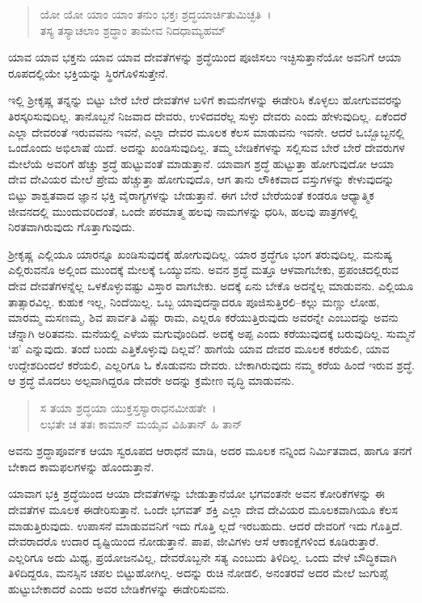 \begin{verse}
ಯೋ ಯೋ ಯಾಂ ಯಾಂ ತನುಂ ಭಕ್ತಃ ಶ್ರದ್ಧಯಾರ್ಚಿತುಮಿಚ್ಛತಿ~।\\ತಸ್ಯ ತಸ್ಯಾಚಲಾಂ ಶ್ರದ್ಧಾಂ ತಾಮೇವ ನಿದಧಾಮ್ಯಹಮ್ 
\end{verse}

{\small ಯಾವ ಯಾವ ಭಕ್ತನು ಯಾವ ಯಾವ ದೇವತೆಗಳನ್ನು ಶ್ರದ್ಧೆಯಿಂದ ಪೂಜಿಸಲು ಇಚ್ಛಿಸುತ್ತಾನೆಯೋ ಅವನಿಗೆ ಆಯಾ ರೂಪದಲ್ಲಿಯೇ ಭಕ್ತಿಯನ್ನು ಸ್ಥಿರಗೊಳಿಸುತ್ತೇನೆ.}

ಇಲ್ಲಿ ಶ‍್ರೀಕೃಷ್ಣ ತನ್ನನ್ನು ಬಿಟ್ಟು ಬೇರೆ ಬೇರೆ ದೇವತೆಗಳ ಬಳಿಗೆ ಕಾಮನೆಗಳನ್ನು ಈಡೇರಿಸಿ ಕೊಳ್ಳಲು ಹೋಗುವವರನ್ನು ತಿರಸ್ಕರಿಸುವುದಿಲ್ಲ. ತಾನೊಬ್ಬನೆ ನಿಜವಾದ ದೇವರು, ಉಳಿದವರೆಲ್ಲ ಸುಳ್ಳು ದೇವರು ಎಂದು ಹೇಳುವುದಿಲ್ಲ. ಏಕೆಂದರೆ ಎಲ್ಲಾ ದೇವರಂತೆ ಇರುವವನು ಇವನೆ, ಎಲ್ಲಾ ದೇವರ ಮೂಲಕ ಕೆಲಸ ಮಾಡುವನು ಇವನೇ. ಆದರೆ ಒಬ್ಬೊಬ್ಬನಲ್ಲಿ ಒಂದೊಂದು ಅಭಿಲಾಷೆ ಯಿದೆ. ಅದನ್ನು ಖಂಡಿಸುವುದಿಲ್ಲ. ತಮ್ಮ ಬೇಡಿಕೆಗಳನ್ನು ಸಲ್ಲಿಸುವ ಬೇರೆ ಬೇರೆ ದೇವರುಗಳ ಮೇಲೆಯೆ ಅವರಿಗೆ ಹೆಚ್ಚು ಶ್ರದ್ಧೆ ಹುಟ್ಟುವಂತೆ ಮಾಡುತ್ತಾನೆ. ಯಾವಾಗ ಶ್ರದ್ಧೆ ಹುಟ್ಟುತ್ತಾ ಹೋಗುವುದೋ ಆಯಾ ದೇವ ದೇವಿಯರ ಮೇಲೆ ಪ್ರೇಮ ಹೆಚ್ಚುತ್ತಾ ಹೋಗುವುದೊ, ಆಗ ತಾನು ಲೌಕಿಕವಾದ ವಸ್ತುಗಳನ್ನು ಕೇಳುವುದನ್ನು ಬಿಟ್ಟು ಶಾಶ್ವತವಾದ ಜ್ಞಾನ ಭಕ್ತಿ ವೈರಾಗ್ಯಗಳನ್ನು ಬೇಡುತ್ತಾನೆ. ಈಗ ಬೇರೆ ಬೇರೆಯಂತೆ ಕಂಡರೂ ಆಧ್ಯಾತ್ಮಿಕ ಜೀವನದಲ್ಲಿ ಮುಂದುವರಿದಂತೆ, ಒಂದೇ ಪರಮಾತ್ಮ ಹಲವು ನಾಮಗಳನ್ನು ಧರಿಸಿ, ಹಲವು ಪಾತ್ರಗಳಲ್ಲಿ ನಿರತವಾಗಿರುವುದು ಗೊತ್ತಾಗುವುದು.

ಶ‍್ರೀಕೃಷ್ಣ ಎಲ್ಲಿಯೂ ಯಾರನ್ನೂ ಖಂಡಿಸುವುದಕ್ಕೆ ಹೋಗುವುದಿಲ್ಲ. ಯಾರ ಶ್ರದ್ಧೆಗೂ ಭಂಗ ತರುವುದಿಲ್ಲ. ಮನುಷ್ಯ ಎಲ್ಲಿರುವನೊ ಅಲ್ಲಿಂದ ಮುಂದಕ್ಕೆ ಮೇಲಕ್ಕೆ ಒಯ್ಯುವನು. ಅವನ ಶ್ರದ್ಧೆ ಮತ್ತೂ ಆಳವಾಗಬೇಕು, ಪ್ರಪಂಚದಲ್ಲಿರುವ ದೇವ ದೇವತೆಗಳನ್ನೆಲ್ಲ ಒಳಕೊಳ್ಳುವಷ್ಟು ವಿಸ್ತಾರ ವಾಗಬೇಕು. ಅದಕ್ಕೆ ಏನು ಬೇಕೊ ಅದನ್ನೆಲ್ಲ ಮಾಡುವನು. ಎಲ್ಲಿಯೂ ತಾತ್ಸಾರವಿಲ್ಲ. ಕುಹುಕ ಇಲ್ಲ, ನಿಂದೆಯಿಲ್ಲ. ಒಬ್ಬ ಯಾವುದನ್ನಾದರೂ ಪೂಜಿಸುತ್ತಿರಲಿ–ಕಲ್ಲು ಮಣ್ಣು ಲೋಹ, ಮಾರಮ್ಮ ಮಸಣಮ್ಮ, ಶಿವ ಪಾರ್ವತಿ ವಿಷ್ಣು ರಾಮ, ಎಲ್ಲರೂ ಕರೆಯುತ್ತಿರುವುದು ಅವರನ್ನೇ ಎಂಬುದನ್ನು ಅವನು ಚೆನ್ನಾಗಿ ಅರಿತವನು. ಮನೆಯಲ್ಲಿ ಎಳೆಯ ಮಗುವೊಂದಿದೆ. ಅದಕ್ಕೆ ಅಪ್ಪ ಎಂದು ಕರೆಯುವುದಕ್ಕೆ ಬರುವುದಿಲ್ಲ. ಸುಮ್ಮನೆ ‘ಪ’ ಎನ್ನುವುದು. ತಂದೆ ಬಂದು ಎತ್ತಿಕೊಳ್ಳುವು ದಿಲ್ಲವೆ? ಹಾಗೆಯೆ ಯಾವ ದೇವರ ಮೂಲಕ ಕರೆಯಲಿ, ಯಾವ ಉದ್ದೇಶದಿಂದಲೆ ಕರೆಯಲಿ, ಎಲ್ಲರಿಗೂ ಓ ಕೊಡುವನು ದೇವರು. ಬೇಕಾಗಿರುವುದು ನಮ್ಮ ಕರೆಯ ಹಿಂದೆ ಇರುವ ಶ್ರದ್ಧೆ. ಆ ಶ್ರದ್ಧೆ ಮೊದಲು ಅಲ್ಪವಾಗಿದ್ದರೂ ದೇವರೇ ಅದನ್ನು ಕ್ರಮೇಣ ವೃದ್ಧಿ ಮಾಡುವನು.

\begin{verse}
ಸ ತಯಾ ಶ್ರದ್ಧಯಾ ಯುಕ್ತಸ್ತಸ್ಯಾರಾಧನಮೀಹತೇ~।\\ಲಭತೇ ಚ ತತಃ ಕಾಮಾನ್ ಮಯೈವ ವಿಹಿತಾನ್ ಹಿ ತಾನ್ 
\end{verse}

{\small ಅವನು ಶ್ರದ್ಧಾಪೂರ್ವಕ ಆಯಾ ಸ್ವರೂಪದ ಆರಾಧನೆ ಮಾಡಿ, ಅದರ ಮೂಲಕ ನನ್ನಿಂದ ನಿರ್ಮಿತವಾದ, ಹಾಗೂ ತನಗೆ ಬೇಕಾದ ಕಾಮಫಲಗಳನ್ನು ಹೊಂದುತ್ತಾನೆ.}

ಯಾವಾಗ ಭಕ್ತಿ ಶ್ರದ್ಧೆಯಿಂದ ಆಯಾ ದೇವತೆಗಳನ್ನು ಬೇಡುತ್ತಾನೆಯೋ ಭಗವಂತನೇ ಅವನ ಕೋರಿಕೆಗಳನ್ನು ಈ ದೇವತೆಗಳ ಮೂಲಕ ಈಡೇರಿಸುತ್ತಾನೆ. ಒಂದೇ ಭಗವತ್ ಶಕ್ತಿ ಎಲ್ಲಾ ದೇವ ದೇವಿಯರ ಮೂಲಕವಾಗಿಯೂ ಕೆಲಸ ಮಾಡುತ್ತಿರುವುದು. ಉಪಾಸನೆ ಮಾಡುವವನಿಗೆ ಇದು ಗೊತ್ತಿ ಲ್ಲದೆ ಇರಬಹುದು. ಆದರೆ ದೇವರಿಗೆ ಇದು ಗೊತ್ತಿದೆ. ದೇವರಾದರೊ ಉದಾರ ದೃಷ್ಟಿಯಿಂದ ನೋಡುತ್ತಾನೆ. ಪಾಪ, ಜೀವಿಗಳು ಆಸೆ ಆಕಾಂಕ್ಷೆಗಳಿಂದ ಕೂಡಿರುತ್ತಾರೆ. ಎಲ್ಲರಿಗೂ ಅದು ಮಿಥ್ಯ, ಪ್ರಯೋಜನವಿಲ್ಲ, ದೇವರೊಬ್ಬನೇ ಸತ್ಯ ಎಂಬುದು ತಿಳಿದಿಲ್ಲ. ಒಂದು ವೇಳೆ ಬೌದ್ಧಿಕವಾಗಿ ತಿಳಿದಿದ್ದರೂ, ಮನಸ್ಸಿನ ಚಪಲ ಬಿಟ್ಟುಹೋಗಿಲ್ಲ. ಅದನ್ನು ರುಚಿ ನೋಡಲಿ, ಅನಂತರವೆ ಅದರ ಮೇಲೆ ಜುಗುಪ್ಸೆ ಹುಟ್ಟುಬೇಕಾದರೆ ಎಂದು ಅವರ ಬೇಡಿಕೆಗಳನ್ನು ಈಡೇರಿಸುವನು.

